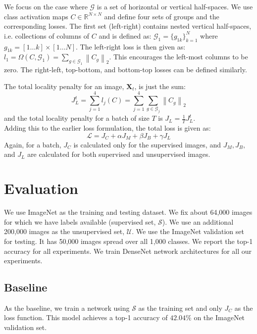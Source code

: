 \documentclass[runningheads]{llncs}
\begin{document}
We focus on the case where $\mathcal{G}$ is a set of horizontal or vertical half-spaces. We use
class activation maps $C \in \mathbb{R}^{N \times N}$ \cite{CAM} and define four sets of groups
and the corresponding losses. The first set (left-right) contains nested vertical half-spaces, i.e.
collections of columns of $C$ and is defined as: $\mathcal{G}_1 = \{g_{1k}\}_{k=1}^{N}$ where $g_{1k} = [1 \dots
k] \times [1 \dots N]$. The left-right loss is then given as: $l_1 = \Omega (C, \mathcal{G}_1) = \sum_{g \in \mathcal{G}_1}
\left \lVert C_g \right \rVert _2$. This encourages the left-most columns to be zero. The right-left,
top-bottom, and bottom-top losses can be defined similarly.

The total locality penalty for an image, $\mathbf{X}_t$, is just the sum:
\begin{equation}
	J_L^t = \sum_{j=1}^{4}l_j(C) = \sum_{j=1}^4 \sum_{g \in \mathcal{G}_j} \left\lVert C_g
	\right\rVert_2
\end{equation}
and the total locality penalty for a batch of size $T$ is $J_L = \frac{1}{T} J_L^t$.\\

Adding this to the earlier loss formulation, the total loss is given as:
\begin{equation}
	\mathcal{L} = J_C + \alpha J_M + \beta J_B + \gamma J_L
\end{equation}
Again, for a batch, $J_C$ is calculated only for the supervised images, and $J_M, J_B, $ and $J_L$
are calculated for both supervised and unsupervised images.


\section{Evaluation}
We use ImageNet as the training and testing dataset. We fix about 64,000 images for which
we have labels available (supervised set, $\mathcal{S}$). We use an additional 200,000 images as the
unsupervised set, $\mathcal{U}$. We use the ImageNet validation set for testing. It has 50,000
images spread over all 1,000 classes. We report the top-1 accuracy for all experiments. We train
DenseNet network architectures for all our experiments.

\subsection{Baseline}
As the baseline, we train a network using $\mathcal{S}$ as the training set and only $J_C$ as the loss
function. This model achieves a top-1 accuracy of $42.04\%$ on the ImageNet validation set. 
\end{document}
